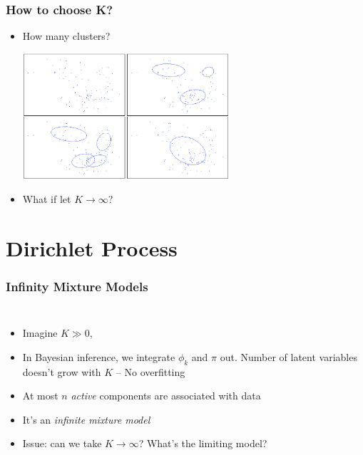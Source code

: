 \documentclass{beamer}
\begin{document}
\begin{frame}
	\frametitle{How to choose K?}
	\begin{itemize}
		\item How many clusters?
		\begin{center}
			\includegraphics[width=0.6\textwidth]{img/unknown.png}
		\end{center}		
		\pause 
		\item What if let $K \rightarrow \infty$?
	\end{itemize}
\end{frame}

\section{Dirichlet Process}


\begin{frame}
	\frametitle{Infinity Mixture Models}	
\begin{columns}
	\begin{itemize}
		\item Imagine $K\gg 0$, 
		\item In Bayesian inference, we integrate $\phi_k$ and $\pi$ out. Number of latent variables doesn't grow with $K$ -- No overfitting
		\item At most $n$ {\em active} components are associated with data
		\item It's an {\em infinite mixture model}
		\item Issue: can we take $K \rightarrow \infty$? What's the limiting model?
	\end{itemize}
	\centering
\end{columns}
\end{frame}
\end{document}
